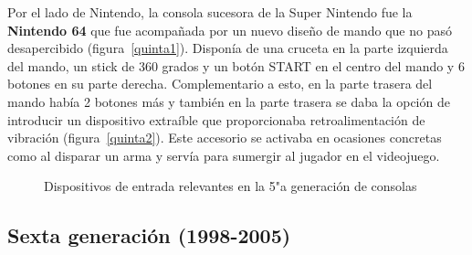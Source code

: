 Por el lado de Nintendo, la consola sucesora de la Super Nintendo fue la \textbf{Nintendo 64} que fue acompa\~nada por un nuevo dise\~no de mando que no pas\'o desapercibido (figura~\ref{quinta1}). Dispon\'ia de una cruceta en la parte izquierda del mando, un stick de 360 grados y un bot\'on START en el centro del mando y 6 botones en su parte derecha. Complementario a esto, en la parte trasera del mando hab\'ia 2 botones m\'as y tambi\'en en la parte trasera se daba la opci\'on de introducir un dispositivo extra\'ible que proporcionaba retroalimentaci\'on de vibraci\'on (figura~\ref{quinta2}). Este accesorio se activaba en ocasiones concretas como al disparar un arma y serv\'ia para sumergir al jugador en el videojuego.\\

\begin{figure}[t]
     \hfill
\hfill
     \caption{Dispositivos de entrada relevantes en la 5"a  generaci\'on de consolas}
     \label{fig:quinta}
   \end{figure}


\subsection{Sexta generaci\'on (1998-2005)}

